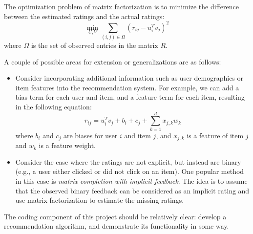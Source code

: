 \documentclass{article}
\begin{document}
\vspace{3mm}
The optimization problem of matrix factorization is to minimize the difference between the estimated ratings and the actual ratings:
$$\min_{U,V} \sum_{(i,j) \in \Omega}(r_{ij} - u_i^T v_j)^2$$ where $\Omega$ is the set of observed entries in the matrix $R$.

\vspace{3mm}
A couple of possible areas for extension or generalizations are as follows:
\begin{itemize}
    \item Consider incorporating additional information such as user demographics or item features into the recommendation system. For example, we can add a bias term for each user and item, and a feature term for each item, resulting in the following equation: $$r_{ij} = u_i^T v_j + b_i + c_j + \sum_{k = 1}^{d} x_{j,k}w_{k}$$ where $b_i$ and $c_j$ are biases for user $i$ and item $j$, and $x_{j,k}$ is a feature of item $j$ and $w_k$ is a feature weight.
    \item Consider the case where the ratings are not explicit, but instead are binary (e.g., a user either clicked or did not click on an item). One popular method in this case is \textit{matrix completion with implicit feedback}. The idea is to assume that the observed binary feedback can be considered as an implicit rating and use matrix factorization to estimate the missing ratings.
\end{itemize}

The coding component of this project should be relatively clear: develop a recommendation algorithm, and demonstrate its functionality in some way.
\end{document}

